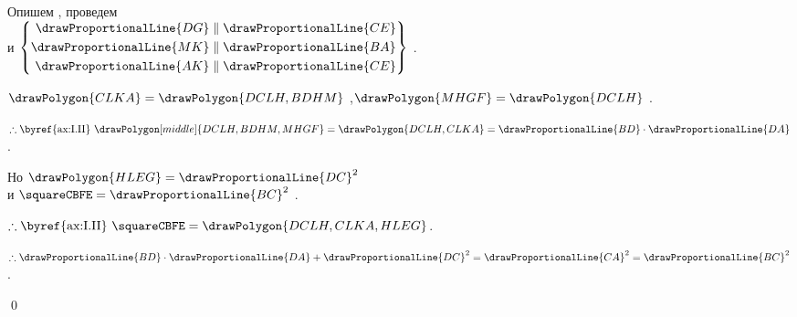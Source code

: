 \documentclass[letters,booklanguage=russian]{byrnebook}
\begin{document}
\begin{center}
Опишем  , проведем \\
и $\left\{
\begin{aligned}
	\drawProportionalLine{DG} & \parallel \drawProportionalLine{CE} \\
	\drawProportionalLine{MK} & \parallel \drawProportionalLine{BA} \\
	\drawProportionalLine{AK} & \parallel \drawProportionalLine{CE} \\
\end{aligned}
\right\}$ .

$\drawPolygon{CLKA} = \drawPolygon{DCLH,BDHM}$ ,$\drawPolygon{MHGF} = \drawPolygon{DCLH}$ .

$\therefore \mbox{\byref{ax:I.II} } \drawPolygon[middle]{DCLH,BDHM,MHGF} = \drawPolygon{DCLH,CLKA} = \drawProportionalLine{BD} \cdot \drawProportionalLine{DA}$.

Но $\drawPolygon{HLEG} = \drawProportionalLine{DC}^2$ \\
и $\squareCBFE = \drawProportionalLine{BC}^2$ \byref{\constref}.

$\therefore \mbox{\byref{ax:I.II} } \squareCBFE = \drawPolygon{DCLH,CLKA,HLEG}$.

$\therefore \drawProportionalLine{BD} \cdot \drawProportionalLine{DA} + \drawProportionalLine{DC}^2 = \drawProportionalLine{CA}^2 = \drawProportionalLine{BC}^2$.
\end{center}

\qed
\end{document}
